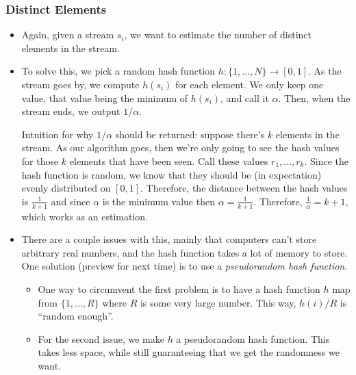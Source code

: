 \subsubsection{Distinct Elements}
\begin{itemize}
	\item Again, given a stream \( s_i \), we want to estimate the number of distinct elements in the stream. 
	\item To solve this, we pick a random hash function \( h: \{1, \dots, N\}  \to [0, 1] \). As the stream 
		goes by, we compute \( h(s_i) \) for each element. We only keep one value, that value being the minimum
		of \( h(s_i) \), and call it \( \alpha \). Then, when the stream ends, we output \( 1 / \alpha \). 
		
		Intuition for why \( 1 / \alpha \) should be returned: suppose there's \( k \) elements in the stream. 
		As our algorithm goes, then we're only going to see the hash values for those \( k \) elements 
		that have been seen. Call these values \( r_1, \dots, r_k \). Since the hash function is random, we 
		know that they should be (in expectation) evenly distributed on \( [0, 1] \). Therefore, the distance
		between the hash values is  \( \frac{1}{k+1} \) and since \( \alpha \) is the minimum value then 
		\( \alpha = \frac{1}{k+1} \). Therefore, \( \frac{1}{\alpha} = k+1 \), which works as an estimation. 



	\item There are a couple issues with this, mainly that computers can't store arbitrary real numbers, and 
		the hash function takes a lot of memory to store. One solution (preview for next time) is to use a 
		\textit{pseudorandom hash function}.
		\begin{itemize}
			\item One way to circumvent the first problem is to have a hash function  \( h \) map from 
				\( \{1, \dots, R\}  \) where \( R  \) is some very large number. This way,  \( h(i)/R \) is 
				``random enough''.
			\item For the second issue, we make \( h \) a pseudorandom hash function. This takes less space, 
				while still guaranteeing that we get the randomness we want.
		\end{itemize}
\end{itemize}
